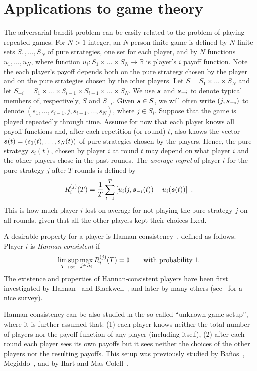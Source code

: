 \documentclass[12pt]{article}
\newcommand{\field}[1]{\mathbb{#1}}
\newcommand{\R}{\field{R}}
\begin{document}
\section{Applications to game theory}
\label{s:game}
The adversarial bandit problem can be easily related to the problem of
playing repeated games.
For $N > 1$ integer, an $N$-person finite game is defined by $N$ finite sets
$S_1,\ldots,S_N$ of pure strategies, one set for each player, and by $N$ functions
$u_1,\ldots,u_N$, where function $u_i : S_1 \times\ldots\times S_N \to \R$ is
player's $i$ payoff function. Note the each player's payoff depends both
on the pure strategy chosen by the player and on the pure strategies chosen by
the other players.
Let $S = S_1 \times\ldots\times S_N$ and let
$S_{-i} = S_1 \times\ldots\times S_{i-1} \times S_{i+1} \times\ldots\times S_N$.
We use $\mbox{\boldmath$s$}$ and $\mbox{\boldmath$s$}_{-i}$ to denote typical members of, respectively,
$S$ and $S_{-i}$. Given $\mbox{\boldmath$s$} \in S$, we will often write $(j,\mbox{\boldmath$s$}_{-i})$ to denote
$(s_1,\ldots,s_{i-1},j,s_{i+1},\ldots,s_N)$, where $j \in S_i$.
Suppose that the game is played repeatedly through time. Assume for now that
each player knows all payoff functions and, after each repetition (or round) $t$,
also knows the vector $\mbox{\boldmath$s$}(t)=(s_1(t),\ldots,s_N(t))$ of pure strategies chosen by
the players. Hence, the pure strategy $s_i(t)$, chosen by player $i$ at round $t$
may depend on what player $i$ and the other players chose in the past rounds.
The {\em average regret} of player $i$ for the pure strategy $j$ after $T$ rounds
is defined by
\[
        R_i^{(j)}(T) = \frac{1}{T} \sum_{t=1}^T
        \left[ u_i(j,\mbox{\boldmath$s$}_{-i}(t)) - u_i(\mbox{\boldmath$s$}(t)) \right]~.
\]
This is how much player $i$ lost on average for not playing the pure strategy $j$
on all rounds, given that all the other players kept their choices fixed.

A desirable property for a player is Hannan-consistency~\cite{FudenbergLe95},
defined as follows. Player $i$ is {\em Hannan-consistent} if
\[
        \limsup_{T\to\infty} \max_{j \in S_i} R_i^{(j)}(T) = 0
\qquad
        \mbox{\rm with probability 1.}
\]
The existence and properties of Hannan-consistent players have been first
investigated by Hannan~\cite{Hannan57} and Blackwell~\cite{Blackwell56b},
and later by many others (see~\cite{FV97} for a nice survey).

Hannan-consistency can be also studied in the so-called ``unknown game setup'',
where it is further assumed that: (1) each player knows neither the total number of
players nor the payoff function of any player (including itself), (2) after each
round each player sees its own payoffs but it sees neither the choices of the
other players nor the resulting payoffs. This setup was previously studied
by Ba\~nos~\cite{Banos68}, Megiddo~\cite{Megiddo80}, and by Hart and
Mas-Colell~\cite{HMC98,HMC99}.
\end{document}
